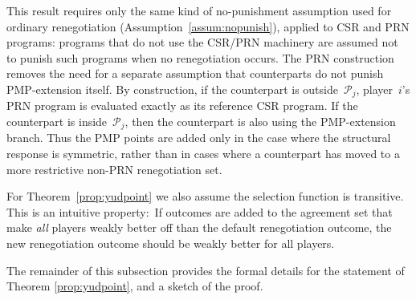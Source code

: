 \documentclass[sigconf]{aamas}
\newcommand{\prnspacej}{\mathcal{P}_j}
\theoremstyle{definition}
\newcommand{\selfunction}[0]{selection}%
\theoremstyle{definition}
\begin{document}
This result requires only the same kind of
no-punishment assumption used for ordinary renegotiation
(Assumption~\ref{assum:nopunish}),
applied to CSR and PRN programs:
programs that do not use the CSR/PRN machinery are assumed not to
punish such programs when no renegotiation occurs.
The PRN construction removes the need for a separate assumption that
counterparts do not punish PMP-extension itself.
By construction, if the counterpart is outside~$\prnspacej$,
player~$i$'s PRN program is evaluated exactly as its reference CSR program.
If the counterpart is inside~$\prnspacej$, then the counterpart is also using
the PMP-extension branch.
Thus the PMP points are added only in the case where the structural response
is symmetric, rather than in cases where a counterpart has moved to a
more restrictive non-PRN renegotiation set.


For Theorem~\ref{prop:yudpoint}
we also assume the \selfunction{} function is transitive.
This is an intuitive property:\ If outcomes are added to the agreement
set that make \textit{all} players weakly better off
than the default renegotiation outcome,
the new renegotiation outcome should be weakly better for all players.

\par The remainder of this subsection provides the formal 
details for the statement of Theorem \ref{prop:yudpoint}, 
and a sketch of the proof.
\end{document}
